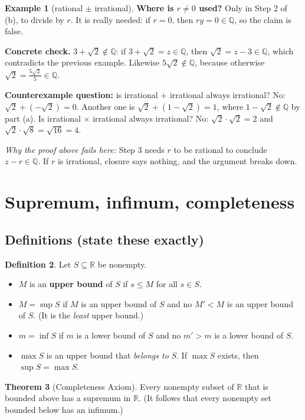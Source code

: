 \documentclass[11pt]{article}
\theoremstyle{definition}
\newtheorem{defn}{Definition}[section]
\newtheorem{thm}[defn]{Theorem}
\newtheorem{ex}[defn]{Example}
\newcommand{\Q}{\mathbb{Q}}
\newcommand{\R}{\mathbb{R}}
\newcommand{\key}[1]{\textcolor{red!70!black}{\textbf{#1}}}
\begin{document}
\begin{ex}[rational $\pm$ irrational]
\noindent\key{Where is $r\ne0$ used?} Only in Step 2 of (b), to divide
by $r$. It is really needed: if $r=0$, then $ry=0\in\Q$, so the claim
is false.

\noindent\key{Concrete check.} $3+\sqrt2\notin\Q$: if $3+\sqrt2=z\in\Q$,
then $\sqrt2=z-3\in\Q$, which contradicts the previous example. Likewise
$5\sqrt2\notin\Q$, because otherwise $\sqrt2=\frac{5\sqrt2}{5}\in\Q$.

\noindent\key{Counterexample question:} is irrational $+$ irrational
always irrational? No: $\sqrt2+(-\sqrt2)=0$. Another one is
$\sqrt2+(1-\sqrt2)=1$, where $1-\sqrt2\notin\Q$ by part (a). Is
irrational $\times$ irrational always irrational? No: $\sqrt2\cdot\sqrt2=2$
and $\sqrt2\cdot\sqrt8=\sqrt{16}=4$.

\noindent\emph{Why the proof above fails here:} Step 3 needs $r$ to be
rational to conclude $z-r\in\Q$. If $r$ is irrational, closure says
nothing, and the argument breaks down.
\end{ex}

\section{Supremum, infimum, completeness}

\subsection{Definitions (state these exactly)}
\begin{defn}
Let $S\subseteq\R$ be nonempty.
\begin{itemize}[nosep]
  \item $M$ is an \textbf{upper bound} of $S$ if $s\le M$ for all $s\in S$.
  \item $M=\sup S$ if $M$ is an upper bound of $S$ and no $M'<M$ is an
        upper bound of $S$. (It is the \emph{least} upper bound.)
  \item $m=\inf S$ if $m$ is a lower bound of $S$ and no $m'>m$ is a lower
        bound of $S$.
  \item $\max S$ is an upper bound that \emph{belongs to} $S$. If
        $\max S$ exists, then $\sup S=\max S$.
\end{itemize}
\end{defn}

\begin{thm}[Completeness Axiom]
Every nonempty subset of $\R$ that is bounded above has a supremum in
$\R$. (It follows that every nonempty set bounded below has an infimum.)
\end{thm}
\end{document}
